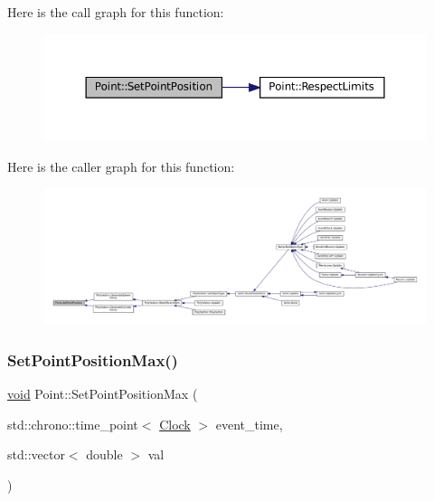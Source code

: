 Here is the call graph for this function\+:\nopagebreak
\begin{figure}[H]
\begin{center}
\leavevmode
\includegraphics[width=350pt]{class_point_a9191f97ece64b8385140d5f800a3a4ca_cgraph}
\end{center}
\end{figure}
Here is the caller graph for this function\+:\nopagebreak
\begin{figure}[H]
\begin{center}
\leavevmode
\includegraphics[width=350pt]{class_point_a9191f97ece64b8385140d5f800a3a4ca_icgraph}
\end{center}
\end{figure}
\mbox{\label{class_point_adb2897b1a7bde15e81b72cb59342f186}} 
\subsubsection{\texorpdfstring{Set\+Point\+Position\+Max()}{SetPointPositionMax()}}
{\footnotesize\ttfamily \mbox{\hyperlink{glad_8h_a950fc91edb4504f62f1c577bf4727c29}{void}} Point\+::\+Set\+Point\+Position\+Max (\begin{DoxyParamCaption}\item[{std\+::chrono\+::time\+\_\+point$<$ \mbox{\hyperlink{universe_8h_a0ef8d951d1ca5ab3cfaf7ab4c7a6fd80}{Clock}} $>$}]{event\+\_\+time,  }\item[{std\+::vector$<$ double $>$}]{val }\end{DoxyParamCaption})\hspace{0.3cm}{\ttfamily [inline]}}



